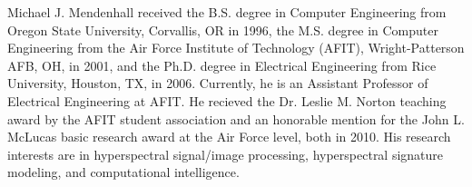 \documentclass[10pt,journal,cspaper,compsoc]{IEEEtran}
\begin{document}
\begin{IEEEbiography}{Michael J. Mendenhall} %
	received the B.S. degree in Computer Engineering from Oregon State University, Corvallis, OR in 1996, the M.S. degree in Computer Engineering 
	from the Air Force Institute of Technology (AFIT), Wright-Patterson AFB, OH, in 2001, and the Ph.D. degree in Electrical Engineering from Rice 
	University, Houston, TX, in 2006. Currently, he is an Assistant Professor of Electrical Engineering at AFIT. He recieved the Dr. Leslie M. Norton 
	teaching award by the AFIT student association and an honorable mention for the John L. McLucas basic research award at the Air Force level, 
	both in 2010.  His research interests are in hyperspectral signal/image processing, hyperspectral signature modeling, and computational intelligence.  
\end{IEEEbiography}
\end{document}
